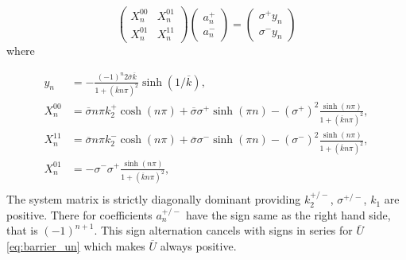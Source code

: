 \documentclass{elsarticle}
\def\ol#1{\overline{#1}}
\begin{document}
\begin{equation}
    \label{eq:an_system}
    \begin{pmatrix} 
            X_n^{00} & X_n^{01} \\ 
            X_n^{01} & X_n^{11}
    \end{pmatrix}
    \begin{pmatrix} 
        a_n^+  \\ 
        a_n^-     
    \end{pmatrix}
     =  
    \begin{pmatrix} 
        \sigma^{+}y_n \\ 
        \sigma^{-}y_n
    \end{pmatrix}
\end{equation}
where
% 

\begin{align}
    \label{eq:yn}    
    y_n     &= -\frac{(-1)^n 2 \ol{\sigma}\ol{k}}{1+(\ol{k} n \pi)^2}\sinh(1/\ol{k}), \\
    X_n^{00}  &= \ol{\sigma}n \pi k_2^+\cosh(n \pi) 
              + \ol{\sigma}\sigma^+\sinh(\pi n)  - (\sigma^+)^2 \frac{\sinh(n \pi)}{1 + (\ol{k} n \pi)^2}, \\    
    X_n^{11}  &= \ol{\sigma}n \pi k_2^-  \cosh(n \pi) 
              + \ol{\sigma}\sigma^-\sinh(\pi n)    - (\sigma^-)^2 \frac{\sinh(n \pi)}{1 + (\ol{k} n \pi)^2}, \\
    X_n^{01}  &= -\sigma^- \sigma^+\frac{\sinh(n \pi)}{1 + (\ol{k} n \pi)^2}, \\    
\end{align}
The system matrix is strictly diagonally dominant providing $k_2^{+/-}$, $\sigma^{+/-}$, $k_1$ are positive.
There for coefficients $a_n^{+/-}$ have the sign same as the right hand side, that is $(-1)^{n+1}$. This sign
alternation cancels with signs in series for $\ol{U}$ \eqref{eq:barrier_un} which makes $\ol{U}$ always positive.
\end{document}
